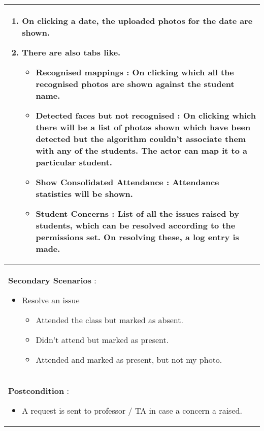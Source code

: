 \documentclass[paper=a4, fontsize=15pt]{scrartcl}
\begin{document}
\begin{tabular}{|p{36em}|}
\begin{enumerate}[topsep=0pt]
     \item On clicking a date, the uploaded photos for the date are shown.
     \item There are also tabs like.
     \begin{itemize}[topsep=0pt]
         \item Recognised mappings : On clicking which all the recognised photos are shown against the student name.
         \item Detected faces but not recognised : On clicking which there will be a list of photos shown which have been detected but the algorithm couldn't associate them with any of the students. The actor can map it to a particular student.
         \item Show Consolidated Attendance : Attendance statistics will be shown.
         \item Student Concerns : List of all the issues raised by students, which can be resolved according to the permissions set. On resolving these, a log entry is made.
     \end{itemize}     
 \end{enumerate}\\
 \hline
 \textbf{Secondary Scenarios }:
 \begin{itemize}[topsep=0pt]
     \item Resolve an issue
     \begin{itemize}[topsep=0pt]
         \item Attended the class but marked as absent.
         \item Didn't attend but marked as present.
         \item Attended and marked as present, but not my photo.
     \end{itemize}       
 \end{itemize}\\
 \hline 
 \textbf{Postcondition }:
 \begin{itemize}[topsep=0pt]
     \item A request is sent to professor / TA in case a concern a raised.    
 \end{itemize}\\
 \hline
 
 
 \end{tabular}



    
    
\end{document}
